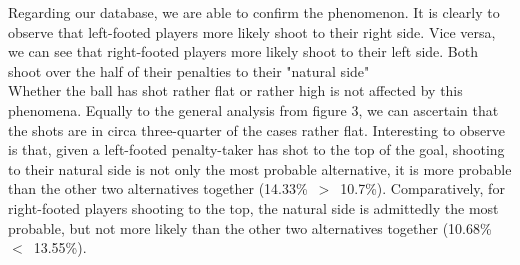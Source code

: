 \documentclass[12pt,dvipsnames]{article}%
\begin{document}
Regarding our database, we are able to confirm the phenomenon. It is clearly to observe that left-footed players more likely shoot to their right side. Vice versa, we can see that right-footed players more likely shoot to their left side. Both shoot over the half of their penalties to their "natural side" \\
Whether the ball has shot rather flat or rather high is not affected by this phenomena. Equally to the general analysis from figure 3, we can ascertain that the shots are in circa three-quarter of the cases rather flat. %
Interesting to observe is that, given a left-footed penalty-taker has shot to the top of the goal, shooting to their natural side is not only the most probable alternative, it is more probable than the other two alternatives together \mbox{(14.33\% $>$ 10.7\%).} Comparatively, for right-footed players shooting to the top, the natural side is admittedly the most probable, but not more likely than the other two alternatives together \mbox{(10.68\% $<$ 13.55\%).}\\

%

  

\end{document}
